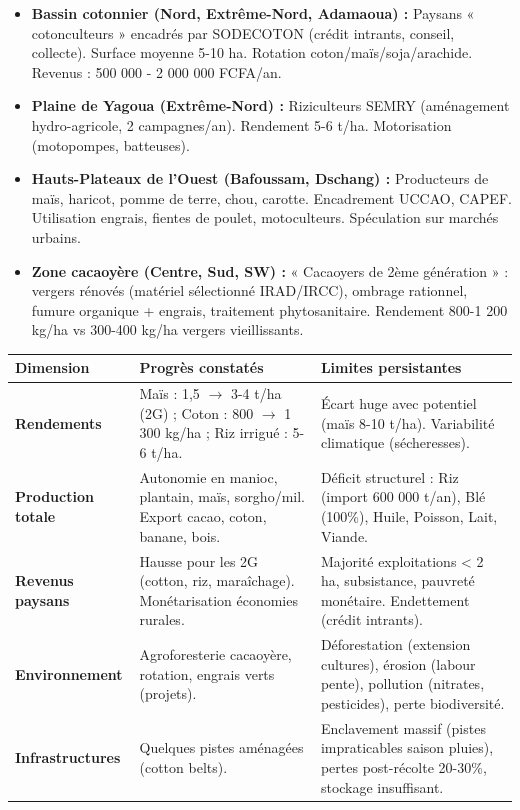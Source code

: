 \documentclass[11pt]{article}
\begin{document}
\begin{exemplebox}
\begin{itemize}
\item \textbf{Bassin cotonnier (Nord, Extrême-Nord, Adamaoua) :} Paysans « cotonculteurs » encadrés par SODECOTON (crédit intrants, conseil, collecte). Surface moyenne 5-10 ha. Rotation coton/maïs/soja/arachide. Revenus : 500 000 - 2 000 000 FCFA/an.
\item \textbf{Plaine de Yagoua (Extrême-Nord) :} Riziculteurs SEMRY (aménagement hydro-agricole, 2 campagnes/an). Rendement 5-6 t/ha. Motorisation (motopompes, batteuses).
\item \textbf{Hauts-Plateaux de l'Ouest (Bafoussam, Dschang) :} Producteurs de maïs, haricot, pomme de terre, chou, carotte. Encadrement UCCAO, CAPEF. Utilisation engrais, fientes de poulet, motoculteurs. Spéculation sur marchés urbains.
\item \textbf{Zone cacaoyère (Centre, Sud, SW) :} « Cacaoyers de 2ème génération » : vergers rénovés (matériel sélectionné IRAD/IRCC), ombrage rationnel, fumure organique + engrais, traitement phytosanitaire. Rendement 800-1 200 kg/ha vs 300-400 kg/ha vergers vieillissants.
\end{itemize}
\end{exemplebox}

\begin{propriete}
\begin{center}
\begin{tabularx}{\linewidth}{|l|X|X|}\hline
\rowcolor{popblueL} \textbf{Dimension} & \textbf{Progrès constatés} & \textbf{Limites persistantes} \\ \hline
\textbf{Rendements} & Maïs : 1,5 $\rightarrow$ 3-4 t/ha (2G) ; Coton : 800 $\rightarrow$ 1 300 kg/ha ; Riz irrigué : 5-6 t/ha. & Écart huge avec potentiel (maïs 8-10 t/ha). Variabilité climatique (sécheresses). \\ \hline
\textbf{Production totale} & Autonomie en manioc, plantain, maïs, sorgho/mil. Export cacao, coton, banane, bois. & Déficit structurel : Riz (import 600 000 t/an), Blé (100\%), Huile, Poisson, Lait, Viande. \\ \hline
\textbf{Revenus paysans} & Hausse pour les 2G (cotton, riz, maraîchage). Monétarisation économies rurales. & Majorité exploitations < 2 ha, subsistance, pauvreté monétaire. Endettement (crédit intrants). \\ \hline
\textbf{Environnement} & Agroforesterie cacaoyère, rotation, engrais verts (projets). & Déforestation (extension cultures), érosion (labour pente), pollution (nitrates, pesticides), perte biodiversité. \\ \hline
\textbf{Infrastructures} & Quelques pistes aménagées (cotton belts). & Enclavement massif (pistes impraticables saison pluies), pertes post-récolte 20-30\%, stockage insuffisant. \\ \hline
\end{tabularx}
\end{center}
\end{propriete}
\end{document}
